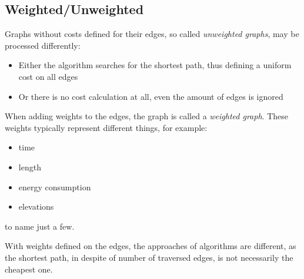 \subsection{Weighted/Unweighted}

Graphs without costs defined for their edges, so called \textit{unweighted graphs}, may be processed differently: 
\begin{itemize}
\item Either the algorithm searches for the shortest path, thus defining a uniform cost on all edges
\item Or there is no cost calculation at all, even the amount of edges is ignored
\end{itemize}

When adding weights to the edges, the graph is called a \textit{weighted graph}. These weights typically represent different things, for example:
\begin{itemize}
\item time
\item length
\item energy consumption
\item elevations
\end{itemize}
to name just a few.

With weights defined on the edges, the approaches of algorithms are different, as the shortest path, in despite of number of traversed edges, is not necessarily the cheapest one. 

\FloatBarrier

